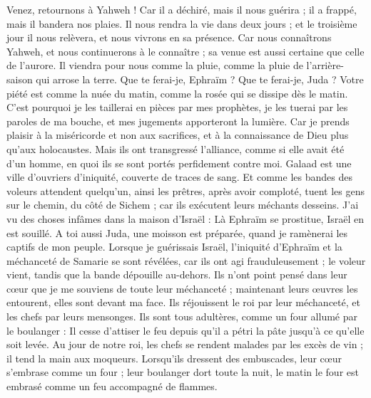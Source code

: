 \begin{multicols}{2}
\VerseOne{}Venez, retournons à Yahweh ! Car il a déchiré, mais il nous guérira ; il a frappé, mais il bandera nos plaies.
Il nous rendra la vie dans deux jours ; et le troisième jour il nous relèvera, et nous vivrons en sa présence.
Car nous connaîtrons Yahweh, et nous continuerons à le connaître ; sa venue est aussi certaine que celle de l'aurore. Il viendra pour nous comme la pluie, comme la pluie de l'arrière-saison qui arrose la terre.
Que te ferai-je, Ephraïm ? Que te ferai-je, Juda ? Votre piété est comme la nuée du matin, comme la rosée qui se dissipe dès le matin.
C'est pourquoi je les taillerai en pièces par mes prophètes, je les tuerai par les paroles de ma bouche, et mes jugements apporteront la lumière.
Car je prends plaisir à la miséricorde et non aux sacrifices, et à la connaissance de Dieu plus qu'aux holocaustes.
Mais ils ont transgressé l'alliance, comme si elle avait été d'un homme, en quoi ils se sont portés perfidement contre moi.
Galaad est une ville d'ouvriers d'iniquité, couverte de traces de sang.
Et comme les bandes des voleurs attendent quelqu'un, ainsi les prêtres, après avoir comploté, tuent les gens sur le chemin, du côté de Sichem ; car ils exécutent leurs méchants desseins.
J'ai vu des choses infâmes dans la maison d'Israël : Là Ephraïm se prostitue, Israël en est souillé.
A toi aussi Juda, une moisson est préparée, quand je ramènerai les captifs de mon peuple.
\VerseOne{}Lorsque je guérissais Israël, l'iniquité d'Ephraïm et la méchanceté de Samarie se sont révélées, car ils ont agi frauduleusement ; le voleur vient, tandis que la bande dépouille au-dehors.
Ils n'ont point pensé dans leur cœur que je me souviens de toute leur méchanceté ; maintenant leurs œuvres les entourent, elles sont devant ma face.
Ils réjouissent le roi par leur méchanceté, et les chefs par leurs mensonges.
Ils sont tous adultères, comme un four allumé par le boulanger : Il cesse d'attiser le feu depuis qu'il a pétri la pâte jusqu'à ce qu'elle soit levée.
Au jour de notre roi, les chefs se rendent malades par les excès de vin ; il tend la main aux moqueurs.
Lorsqu'ils dressent des embuscades, leur cœur s'embrase comme un four ; leur boulanger dort toute la nuit, le matin le four est embrasé comme un feu accompagné de flammes.

\end{multicols}
